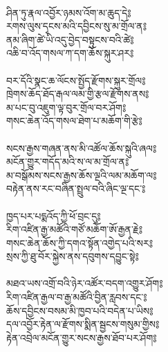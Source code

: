 {\\
ཤིན་ཏུ་རྣལ་འབྱོར་ཉམས་འོག་མ་ཆུད་དེ༔\\
རགས་ལུས་དྭངས་མའི་དབྱིངས་སུ་མ་གྲོལ་ན༔\\
ནམ་ཞིག་ཚེ་ཡི་འདུ་བྱེད་བསྟུངས་བའི་ཚེ༔\\
འཆི་བ་འོད་གསལ་ཀ་དག་ཆོས་སྐུར་ཤར༔\\
\\
བར་དོའི་སྣང་ཆ་ལོངས་སྤྱོད་རྫོགས་སྐུར་གྲོལ༔\\
ཁྲེགས་ཆོད་ཐོད་རྒལ་ལམ་གྱི་རྩལ་རྫོགས་ནས༔\\
མ་པང་བུ་འཇུག་ལྟ་བུར་གྲོལ་བར་ཤོག༔\\
གསང་ཆེན་འོད་གསལ་ཐེག་པ་མཆོག་གི་རྩེ༔\\
\\
སངས་རྒྱས་གཞན་ནས་མི་འཚོལ་ཆོས་སྐུའི་ཞལ༔\\
མངོན་གྱུར་གདོད་མའི་ས་ལ་མ་གྲོལ་ན༔\\
མ་བསྒོམས་སངས་རྒྱས་ཆོས་ལྔའི་ལམ་མཆོག་ལ༔\\
བརྟེན་ནས་རང་བཞིན་སྤྲུལ་བའི་ཞིང་ལྔ་དང་༔\\
\\
ཁྱད་པར་པདྨའོད་ཀྱི་ཕོ་བྲང་དུ༔\\
རིག་འཛིན་རྒྱ་མཚོའི་གཙོ་མཆོག་ཨོ་རྒྱན་རྗེ༔\\
གསང་ཆེན་ཆོས་ཀྱི་དགའ་སྟོན་འགྱེད་པའི་སར༔\\
སྲས་ཀྱི་ཐུ་བོར་སྐྱེས་ནས་དབུགས་དབྱུང་སྟེ༔\\
\\
མཐའ་ཡས་འགྲོ་བའི་ཉེར་འཚོར་བདག་འགྱུར་ཤོག༔\\
རིག་འཛིན་རྒྱལ་བ་རྒྱ་མཚོའི་བྱིན་རླབས་དང་༔\\
ཆོས་དབྱིངས་བསམ་མི་ཁྱབ་པའི་བདེན་པ་ཡིས༔\\
དལ་འབྱོར་རྟེན་ལ་རྫོགས་སྨིན་སྦྱངས་གསུམ་གྱིས༔\\
རྟེན་འབྲེལ་མངོན་གྱུར་སངས་རྒྱས་ཐོབ་པར་ཤོག༔\\
}\\

